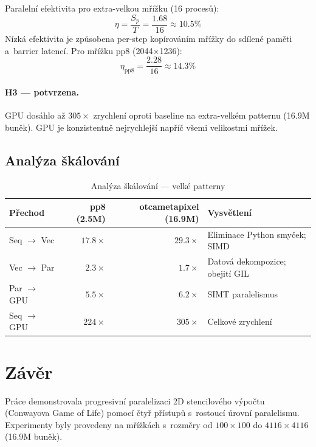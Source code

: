 \documentclass[12pt,a4paper]{article}
\begin{document}
\noindent Paralelní efektivita pro extra-velkou mřížku (16 procesů):
\[
\eta = \frac{S_p}{T} = \frac{1.68}{16} \approx 10.5\%
\]
Nízká efektivita je způsobena per-step kopírováním mřížky do sdílené paměti a~barrier latencí. Pro mřížku pp8 (2044$\times$1236):
\[
\eta_{\text{pp8}} = \frac{2.28}{16} \approx 14.3\%
\]

\paragraph{H3 --- potvrzena.} GPU dosáhlo až $305\times$ zrychlení oproti baseline na extra-velkém patternu (16.9M buněk). GPU je konzistentně nejrychlejší napříč všemi velikostmi mřížek.

\subsection{Analýza škálování}

\begin{table}[H]
\centering
\begin{tabular}{@{}lrrl@{}}
\toprule
\textbf{Přechod} & \textbf{pp8 (2.5M)} & \textbf{otcametapixel (16.9M)} & \textbf{Vysvětlení} \\
\midrule
Seq $\to$ Vec    & $17.8\times$ & $29.3\times$  & Eliminace Python smyček; SIMD \\
Vec $\to$ Par    & $2.3\times$  & $1.7\times$   & Datová dekompozice; obejití GIL \\
Par $\to$ GPU    & $5.5\times$  & $6.2\times$   & SIMT paralelismus \\
Seq $\to$ GPU    & $224\times$  & $305\times$   & Celkové zrychlení \\
\bottomrule
\end{tabular}
\caption{Analýza škálování --- velké patterny}
\end{table}

\section{Závěr}

Práce demonstrovala progresivní paralelizaci 2D stencilového výpočtu (Conwayova Game of Life) pomocí čtyř přístupů s~rostoucí úrovní paralelismu. Experimenty byly provedeny na mřížkách s~rozměry od $100{\times}100$ do $4116{\times}4116$ (16.9M buněk).
\end{document}
